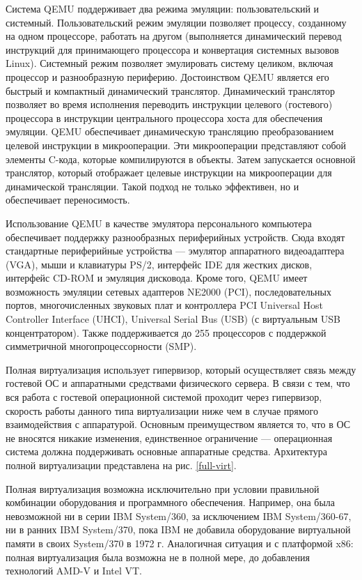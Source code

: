Система QEMU поддерживает два режима эмуляции: пользовательский и системный.
Пользовательский режим эмуляции позволяет процессу, созданному на одном процессоре, работать на другом (выполняется динамический перевод инструкций для принимающего процессора и конвертация системных вызовов Linux).
Системный режим позволяет эмулировать систему целиком, включая процессор и разнообразную периферию.
Достоинством QEMU является его быстрый и компактный динамический транслятор.
Динамический транслятор позволяет во время исполнения переводить инструкции целевого (гостевого) процессора в инструкции центрального процессора хоста для обеспечения эмуляции.
QEMU обеспечивает динамическую трансляцию преобразованием целевой инструкции в микрооперации.
Эти микрооперации представляют собой элементы C-кода, которые компилируются в объекты.
Затем запускается основной транслятор, который отображает целевые инструкции на микрооперации для динамической трансляции.
Такой подход не только эффективен, но и обеспечивает переносимость.

Использование QEMU в качестве эмулятора персонального компьютера обеспечивает поддержку разнообразных периферийных устройств.
Сюда входят стандартные периферийные устройства --- эмулятор аппаратного видеоадаптера (VGA), мыши и клавиатуры PS/2, интерфейс IDE для жестких дисков, интерфейс CD-ROM и эмуляция дисковода.
Кроме того, QEMU имеет возможность эмуляции сетевых адаптеров NE2000 (PCI), последовательных портов, многочисленных звуковых плат и контроллера PCI Universal Host Controller Interface (UHCI), Universal Serial Bus (USB) (с виртуальным USB концентратором).
Также поддерживается до 255 процессоров с поддержкой симметричной многопроцессорности (SMP).

Полная виртуализация использует гипервизор, который осуществляет связь между гостевой ОС и аппаратными средствами физического сервера.
В связи с тем, что вся работа с гостевой операционной системой проходит через гипервизор, скорость работы данного типа виртуализации ниже чем в случае прямого взаимодействия с аппаратурой.
Основным преимуществом является то, что в ОС не вносятся никакие изменения, единственное ограничение --- операционная система должна поддерживать основные аппаратные средства.
Архитектура полной виртуализации представлена на рис. \ref{full-virt}.

Полная виртуализация возможна исключительно при условии правильной комбинации оборудования и программного обеспечения.
Например, она была невозможной ни в серии IBM System/360, за исключением IBM System/360-67, ни в ранних IBM System/370, пока IBM не добавила оборудование виртуальной памяти в своих System/370 в 1972 г.
Аналогичная ситуация и с платформой x86: полная виртуализация была возможна не в полной мере, до добавления технологий AMD-V и Intel VT.

